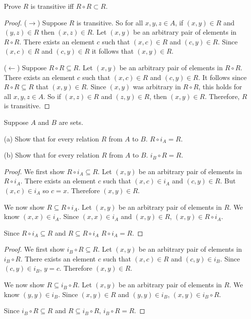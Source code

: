 \begin{tcolorbox}[title=Problem 8, breakable]
    Prove $R$ is transitive iff $R \circ R \subset R$.
\end{tcolorbox}

\begin{proof}
    ($\rightarrow$) Suppose $R$ is transitive.
    So for all $x, y, z \in A$, if $(x, y) \in R$ 
        and $(y, z) \in R$ then $(x, z) \in R$.
    Let $(x, y)$ be an arbitrary pair of elements in $R \circ R$.
    There exists an element $c$ such that $(x, c) \in R$ and $(c, y) \in R$.
    Since $(x, c) \in R$ and $(c, y) \in R$ it follows that $(x, y) \in R$.

    ($\leftarrow$) Suppose $R \circ R \subseteq R$.
    Let $(x, y)$ be an arbitrary pair of elements in $R \circ R$.
    There exists an element $c$ such that $(x, c) \in R$ and $(c, y) \in R$.
    It follows since $R \circ R \subseteq R$ that $(x, y) \in R$.
    Since $(x, y)$ was arbitrary in $R \circ R$, this holds 
        for all $x, y, z \in A$. 
    So if $(x, z) \in R$ and $(z, y) \in R$, then $(x, y) \in R$.
    Therefore, $R$ is transitive.
\end{proof}

\begin{tcolorbox}[title=Problem 9, breakable]
    Suppose $A$ and $B$ are sets.

    (a) Show that for every relation $R$ from $A$ to $B$. $R \circ i_A = R$.

    (b) Show that for every relation $R$ from $A$ to $B$. $i_B \circ R = R$.
\end{tcolorbox}

\begin{proof}
    We first show $R \circ i_A \subseteq R$.
    Let $(x, y)$ be an arbitrary pair of elements in $R \circ i_A$.
    There exists an element $c$ such that $(x, c) \in i_A$ and $(c, y) \in R$.
    But $(x, c) \in i_A$ so $c = x$.
    Therefore $(x, y) \in R$.

    We now show $R \subseteq R \circ i_A$.
    Let $(x, y)$ be an arbitrary pair of elements in $R$.
    We know $(x, x) \in i_A$. 
    Since $(x, x) \in i_A$ and $(x, y) \in R$, $(x, y) \in R \circ i_A$.

    Since $R \circ i_A \subseteq R$ and $R \subseteq R \circ i_A$
        $R \circ i_A = R$.
\end{proof}

\begin{proof}
    We first show $i_B \circ R \subseteq R$.
    Let $(x, y)$ be an arbitrary pair of elements in $i_B \circ R$.
    There exists an element $c$ such that $(x, c) \in R$ and $(c, y) \in i_B$.
    Since $(c, y) \in i_B$, $y = c$.
    Therefore $(x, y) \in R$.

    We now show $R \subseteq i_B \circ R$.
    Let $(x, y)$ be an arbitrary pair of elements in $R$.
    We know $(y, y) \in i_B$.
    Since $(x, y) \in R$ and $(y, y) \in i_B$, $(x, y) \in i_B \circ R$.

    Since $i_B \circ R \subseteq R$ and $R \subseteq i_B \circ R$,
        $i_B \circ R = R$.
\end{proof}

